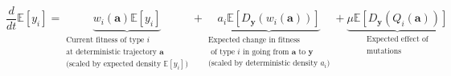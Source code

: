 \begin{equation}
\label{nD_moment_eqn_mean_replicator}
\frac{d}{dt}\mathbb{E}[y_i] = \underbrace{w_i(\mathbf{a})\mathbb{E}[y_i]}_{\substack{\text{Current fitness of type $i$} \\ \text{at deterministic trajectory $\mathbf{a}$} \\ \text{(scaled by expected density $\mathbb{E}[y_i]$)}}} + \underbrace{a_i\mathbb{E}[D_{\mathbf{y}}(w_i(\mathbf{a}))]}_{\substack{\text{Expected change in fitness} \\ \text{ of type $i$ in going from $\mathbf{a}$ to $\mathbf{y}$} \\ \text{(scaled by deterministic density $a_i$)}}} + \underbrace{\mu\mathbb{E}[D_{\mathbf{y}}(Q_i(\mathbf{a}))]}_{\substack{\text{Expected effect of} \\ \text{mutations}}}
\end{equation}

